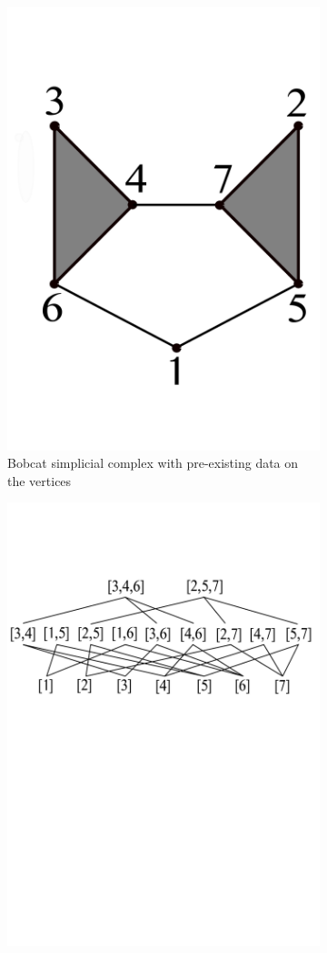 \documentclass[11pt]{article}
\begin{document}
\begin{figure}
\centering
\begin{subfigure}{.33\textwidth}
  \centering
  \includegraphics[width=.4\linewidth]{cat2.pdf}
  \caption{Bobcat simplicial complex with pre-existing data on the vertices}
  \label{fig:sub1}
\end{subfigure}%
\begin{subfigure}{.33\textwidth}
  \centering
  \includegraphics[width=.95\linewidth]{cat-hasse-sorted.pdf}

\end{subfigure}
\end{figure}
\end{document}
